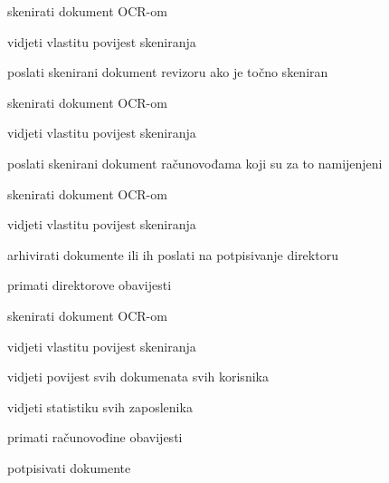 			
			\begin{packed_enum}
				\item  {}
				
				\begin{packed_enum}
					
					\item skenirati dokument OCR-om
					\item vidjeti vlastitu povijest skeniranja
					\item poslati skenirani dokument revizoru ako je točno skeniran
					
				\end{packed_enum}
			
				\item  {}
				
				\begin{packed_enum}
					
					\item skenirati dokument OCR-om
					\item vidjeti vlastitu povijest skeniranja
					\item poslati skenirani dokument računovođama koji su za to namijenjeni
					
				\end{packed_enum}

                \item  {}
				
				\begin{packed_enum}
					
					\item skenirati dokument OCR-om
					\item vidjeti vlastitu povijest skeniranja
					\item arhivirati dokumente ili ih poslati na potpisivanje direktoru
					\item primati direktorove obavijesti
					
				\end{packed_enum}

                \item  {}
				
				\begin{packed_enum}
					
					\item skenirati dokument OCR-om
					\item vidjeti vlastitu povijest skeniranja
					\item vidjeti povijest svih dokumenata svih korisnika
					\item vidjeti statistiku svih zaposlenika   
					\item primati računovođine obavijesti
					\item potpisivati dokumente
					
				\end{packed_enum}
			\end{packed_enum}
			
